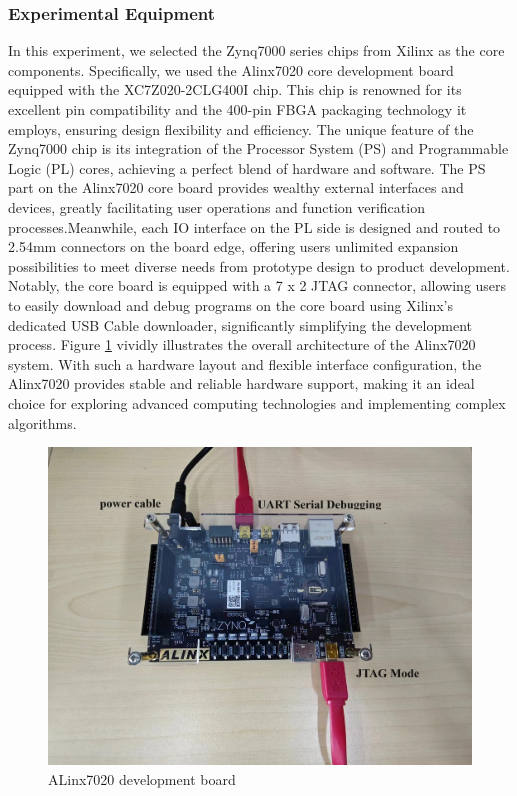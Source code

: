 \documentclass[electronics,article,accept,pdftex,moreauthors]{Definitions/mdpi}
\begin{document}
\subsubsection{Experimental Equipment}
In this experiment, we selected the Zynq7000 series chips from Xilinx as the core components. Specifically, we used the Alinx7020 core development board equipped with the XC7Z020-2CLG400I chip. This chip is renowned for its excellent pin compatibility and the 400-pin FBGA packaging technology it employs, ensuring design flexibility and efficiency. The unique feature of the Zynq7000 chip is its integration of the Processor System (PS) and Programmable Logic (PL) cores, achieving a perfect blend of hardware and software. The PS part on the Alinx7020 core board provides wealthy external interfaces and devices, greatly facilitating user operations and function verification processes.Meanwhile, each IO interface on the PL side is designed and routed to 2.54mm connectors on the board edge, offering users unlimited expansion possibilities to meet diverse needs from prototype design to product development. Notably, the core board is equipped with a 7 x 2 JTAG connector, allowing users to easily download and debug programs on the core board using Xilinx’s dedicated USB Cable downloader, significantly simplifying the development process. Figure \ref{fig6} vividly illustrates the overall architecture of the Alinx7020 system. With such a hardware layout and flexible interface configuration, the Alinx7020 provides stable and reliable hardware support, making it an ideal choice for exploring advanced computing technologies and implementing complex algorithms.
\begin{figure}[H]
    \includegraphics[scale=0.23]{./images/6.png}
    \caption{ALinx7020 development board}
    \label{fig6}
\end{figure}
\end{document}
